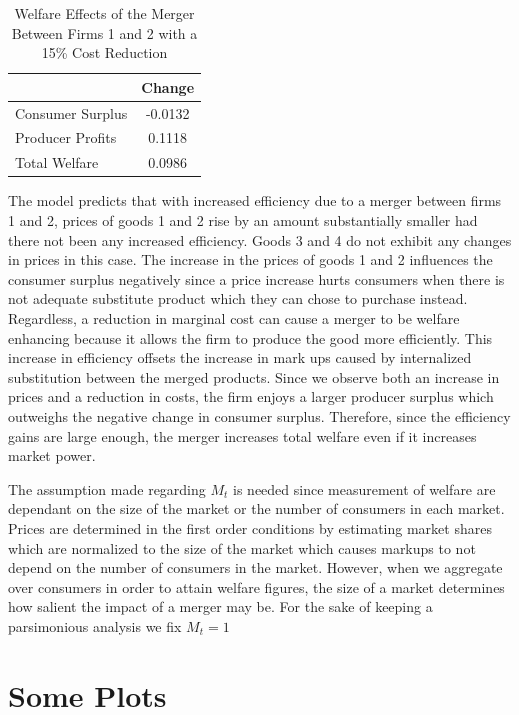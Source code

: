 \documentclass[12pt]{article}
\begin{document}
\begin{table}[h!]
\centering
\caption{Welfare Effects of the Merger Between Firms 1 and 2 with a 15\% Cost Reduction}
\begin{tabular}{l c}
\hline
 & \textbf{Change} \\
\hline
Consumer Surplus & -0.0132 \\
Producer Profits & 0.1118 \\
Total Welfare & 0.0986 \\
\hline
\end{tabular}
\end{table}

The model predicts that with increased efficiency due to a merger between firms 1 and 2, prices of goods 1 and 2 rise by an amount substantially smaller had there not been any increased efficiency. Goods 3 and 4 do not exhibit any changes in prices in this case. The increase in the prices of goods 1 and 2 influences the consumer surplus negatively since a price increase hurts consumers when there is not adequate substitute product which they can chose to purchase instead. Regardless, a reduction in marginal cost can cause a merger to be welfare enhancing because it allows the firm to produce the good more efficiently. This increase in efficiency offsets the increase in mark ups caused by internalized substitution between the merged products. Since we observe both an increase in prices and a reduction in costs, the firm enjoys a larger producer surplus which outweighs the negative change in consumer surplus. Therefore, since the efficiency gains are large enough, the merger increases total welfare even if it increases market power.

The assumption made regarding $M_t$ is needed since measurement of welfare are dependant on the size of the market or the number of consumers in each market. Prices are determined in the first order conditions by estimating market shares which are normalized to the size of the market which causes markups to not depend on the number of consumers in the market. However, when we aggregate over consumers in order to attain welfare figures, the size of a market determines how salient the impact of a merger may be. For the sake of keeping a parsimonious analysis we fix $M_t = 1$

\section{Some Plots}
\end{document}
